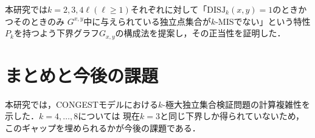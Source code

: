 \documentclass[a4j,twoside]{jarticle}
\newcommand{\CONGEST}{\textsf{CONGEST}}
\theoremstyle{definition}
\begin{document}
\begin{論文概要}
本研究では$k=2, 3, 4\ell(\ell \geq 1)$それぞれに対して「$\mathrm{DISJ}_{k} (x, y)=1$のときかつそのときのみ
$G^{x,y}$中に与えられている独立点集合が$k$-MISでない」という特性$P_{k}$を持つよう下界グラフ$G_{x,y}$の構成法を提案し，その正当性を証明した．
\section{まとめと今後の課題}
本研究では，{\CONGEST}モデルにおける$k$-極大独立集合検証問題の計算複雑性を示した．$k=4, \ldots, 8$については
現在$k=3$と同じ下界しか得られていないため，このギャップを埋められるかが今後の課題である．




\clearpage
\end{論文概要}
\end{document}
